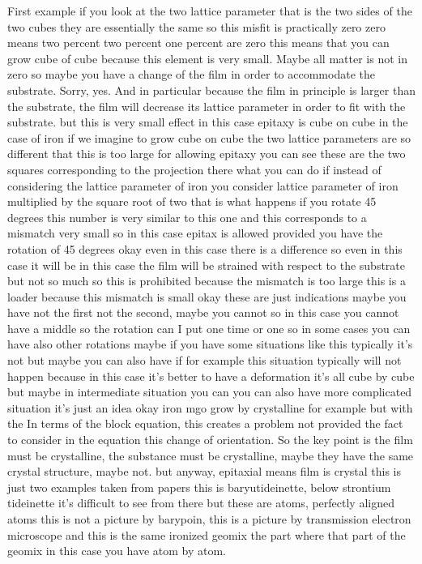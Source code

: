 First example if you look at the two lattice parameter that is the two sides of the two cubes they are essentially the same so this misfit is practically zero zero means two percent two percent one percent are zero this means that you can grow cube of cube because this element is very small. Maybe all matter is not in zero so maybe you have a change of the film in order to accommodate the substrate. Sorry, yes. And in particular because the film in principle is larger than the substrate, the film will decrease its lattice parameter in order to fit with the substrate. but this is very small effect in this case epitaxy is cube on cube in the case of iron if we imagine to grow cube on cube the two lattice parameters are so different that this is too large for allowing epitaxy you can see these are the two squares corresponding to the projection there what you can do if instead of considering the lattice parameter of iron you consider lattice parameter of iron multiplied by the square root of two that is what happens if you rotate 45 degrees this number is very similar to this one and this corresponds to a mismatch very small so in this case epitax is allowed provided you have the rotation of 45 degrees okay even in this case there is a difference so even in this case it will be in this case the film will be strained with respect to the substrate but not so much so this is prohibited because the mismatch is too large this is a loader because this mismatch is small okay these are just indications maybe you have not the first not the second, maybe you cannot so in this case you cannot have a middle so the rotation can I put one time or one so in some cases you can have also other rotations maybe if you have some situations like this typically it's not but maybe you can also have if for example this situation typically will not happen because in this case it's better to have a deformation it's all cube by cube but maybe in intermediate situation you can you can also have more complicated situation it's just an idea okay iron mgo grow by crystalline for example but with the In terms of the block equation, this creates a problem not provided the fact to consider in the equation this change of orientation. So the key point is the film must be crystalline, the substance must be crystalline, maybe they have the same crystal structure, maybe not. but anyway, epitaxial means film is crystal this is just two examples taken from papers this is baryutideinette, below strontium tideinette it's difficult to see from there but these are atoms, perfectly aligned atoms this is not a picture by barypoin, this is a picture by transmission electron microscope and this is the same ironized geomix the part where that part of the geomix in this case you have atom by atom.
